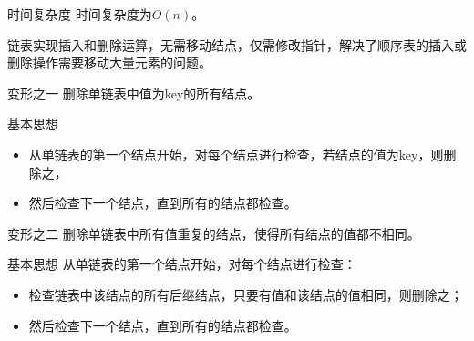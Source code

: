 \begin{frame}[fragile]
 
\pause
\begin{block}{时间复杂度}
时间复杂度为$O(n)$。
\end{block}
\end{frame}

\begin{frame}[fragile]
链表实现插入和删除运算，无需移动结点，仅需修改指针，解决了顺序表的插入或删除操作需要移动大量元素的问题。
\end{frame}

\begin{frame}[fragile]
\begin{block}{变形之一}
删除单链表中值为key的所有结点。
\end{block}
\pause 
\begin{block}{基本思想}
\begin{itemize}
\item
从单链表的第一个结点开始，对每个结点进行检查，若结点的值为key，则删除之，
\item
然后检查下一个结点，直到所有的结点都检查。
\end{itemize}
\end{block}


\end{frame}



\begin{frame}[fragile]
\begin{block}{变形之二}
删除单链表中所有值重复的结点，使得所有结点的值都不相同。
\end{block}
\pause 
\begin{block}{基本思想}
从单链表的第一个结点开始，对每个结点进行检查：
\begin{itemize}
\item
检查链表中该结点的所有后继结点，只要有值和该结点的值相同，则删除之；
\item
然后检查下一个结点，直到所有的结点都检查。
\end{itemize}
\end{block}


\end{frame}



